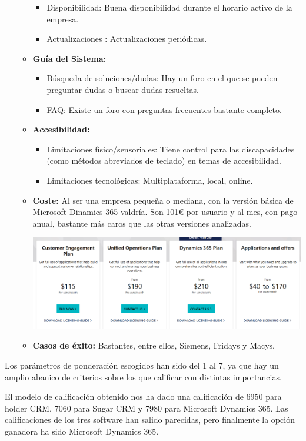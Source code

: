 \documentclass{article}
\begin{document}
\begin{itemize}
\begin{itemize}
\begin{itemize}
\item Disponibilidad: Buena disponibilidad durante el horario activo de la empresa. 
\item Actualizaciones : Actualizaciones periódicas. 
\end{itemize}
\item \textbf{Guía del Sistema:}
\begin{itemize}
\item Búsqueda de soluciones/dudas: Hay un foro en el que se pueden preguntar dudas o buscar dudas resueltas. 
\item FAQ: Existe un foro con preguntas frecuentes bastante completo. 
\end{itemize}
\item \textbf{Accesibilidad:}
\begin{itemize}
\item Limitaciones físico/sensoriales: Tiene control para las discapacidades (como métodos abreviados de teclado) en temas de accesibilidad. 
\item Limitaciones tecnológicas: Multiplataforma, local, online. 
\end{itemize}
\item \textbf{Coste:} Al ser una empresa pequeña o mediana, con la versión básica de Microsoft Dinamics 365 valdría. Son 101€ por usuario y al mes, con pago anual, bastante más caros que las otras versiones analizadas. 
\begin{center}
\includegraphics[scale=0.5]{images/costes.png}
\end{center}
\item \textbf{Casos de éxito:} Bastantes, entre ellos, Siemens, Fridays y Macys.
\end{itemize}
\end{itemize}

Los parámetros de ponderación escogidos han sido del 1 al 7, ya que hay un amplio abanico de criterios sobre los que calificar con distintas importancias. 

El modelo de calificación obtenido nos ha dado una calificación de 6950 para holder CRM, 7060 para Sugar CRM y 7980 para Microsoft Dynamics 365. Las calificaciones de los tres software han salido parecidas, pero finalmente la opción ganadora ha sido Microsoft Dynamics 365.
\end{document}
